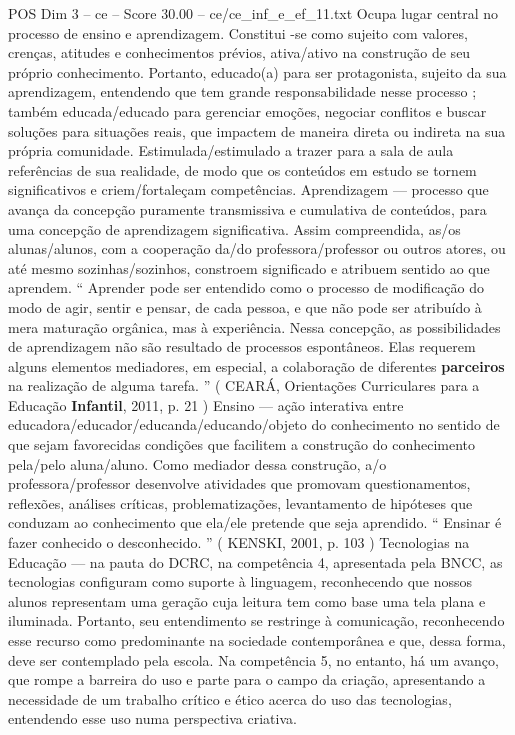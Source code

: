 \begin{textsample}{POS Dim 3 – ce – Score 30.00 – ce/ce\_inf\_e\_ef\_11.txt}
Ocupa lugar central no processo de ensino e aprendizagem.
Constitui -se como sujeito com valores, crenças, atitudes e conhecimentos prévios, ativa/ativo na construção de seu próprio conhecimento.
Portanto, educado(a) para ser protagonista, sujeito da sua aprendizagem, entendendo que tem grande responsabilidade nesse processo ; também educada/educado para gerenciar emoções, negociar conflitos e buscar soluções para situações reais, que impactem de maneira direta ou indireta na sua própria comunidade.
Estimulada/estimulado a trazer para a sala de aula referências de sua realidade, de modo que os conteúdos em estudo se tornem significativos e criem/fortaleçam competências.
Aprendizagem — processo que avança da concepção puramente transmissiva e cumulativa de conteúdos, para uma concepção de aprendizagem significativa.
Assim compreendida, as/os alunas/alunos, com a cooperação da/do professora/professor ou outros atores, ou até mesmo sozinhas/sozinhos, constroem significado e atribuem sentido ao que aprendem. “ Aprender pode ser entendido como o processo de modificação do modo de agir, sentir e pensar, de cada pessoa, e que não pode ser atribuído à mera maturação orgânica, mas à experiência.
Nessa concepção, as possibilidades de aprendizagem não são resultado de processos espontâneos.
Elas requerem alguns elementos mediadores, em especial, a colaboração de diferentes \textbf{parceiros} na realização de alguma tarefa. ” ( CEARÁ, Orientações Curriculares para a Educação \textbf{Infantil}, 2011, p. 21 ) Ensino — ação interativa entre educadora/educador/educanda/educando/objeto do conhecimento no sentido de que sejam favorecidas condições que facilitem a construção do conhecimento pela/pelo aluna/aluno.
Como mediador dessa construção, a/o professora/professor desenvolve atividades que promovam questionamentos, reflexões, análises críticas, problematizações, levantamento de hipóteses que conduzam ao conhecimento que ela/ele pretende que seja aprendido. “ Ensinar é fazer conhecido o desconhecido. ” ( KENSKI, 2001, p. 103 ) Tecnologias na Educação — na pauta do DCRC, na competência 4, apresentada pela BNCC, as tecnologias configuram como suporte à linguagem, reconhecendo que nossos alunos representam uma geração cuja leitura tem como base uma tela plana e iluminada.
Portanto, seu entendimento se restringe à comunicação, reconhecendo esse recurso como predominante na sociedade contemporânea e que, dessa forma, deve ser contemplado pela escola.
Na competência 5, no entanto, há um avanço, que rompe a barreira do uso e parte para o campo da criação, apresentando a necessidade de um trabalho crítico e ético acerca do uso das tecnologias, entendendo esse uso numa perspectiva criativa.

\end{textsample}
